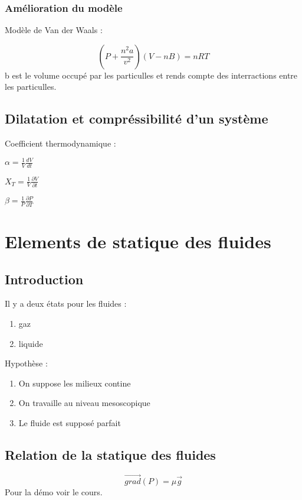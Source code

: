 \documentclass[a4paper,10pt]{report}
\begin{document}
\subsection{Amélioration du modèle}
Modèle de Van der Waals :

\begin{equation}
 (P+\frac{n^2 a}{v^2})(V-nB)=nRT
\end{equation}
b est le volume occupé par les particulles et rends compte des interractions entre les particulles.

\section{Dilatation et compréssibilité d'un système}
Coefficient thermodynamique :

\begin{math}
 \alpha = \frac{1}{V} \frac{dV}{dt}
\end{math}

\begin{math}
 X_T = \frac{1}{V} \frac{\partial V}{\partial t}
\end{math}

\begin{math}
 \beta = \frac{1}{P} \frac{\partial P}{\partial T}
\end{math}

\chapter{Elements de statique des fluides}
\section{Introduction}
Il y a deux états pour les fluides :
\begin{enumerate}
 \item gaz
 \item liquide
\end{enumerate}
Hypothèse :
\begin{enumerate}
 \item On suppose les milieux contine
 \item On travaille au niveau mesoscopique
 \item Le fluide est supposé parfait
\end{enumerate}
\section{Relation de la statique des fluides}
\begin{equation}
  \overrightarrow{grad}(P) = \mu \overrightarrow{g}
\end{equation}
Pour la démo voir le cours.
\end{document}
